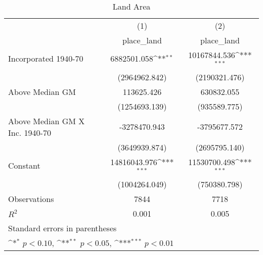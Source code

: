 \begin{table}[htbp]\centering
\def\sym#1{\ifmmode^{#1}\else\(^{#1}\)\fi}
\caption{Land Area}
\begin{tabular}{l*{2}{c}}
\hline\hline
                    &\multicolumn{1}{c}{(1)}&\multicolumn{1}{c}{(2)}\\
                    &\multicolumn{1}{c}{place\_land}&\multicolumn{1}{c}{place\_land}\\
\hline
Incorporated 1940-70& 6882501.058\sym{**} &10167844.536\sym{***}\\
                    &(2964962.842)         &(2190321.476)         \\
[1em]
Above Median GM     &  113625.426         &  630832.055         \\
                    &(1254693.139)         &(935589.775)         \\
[1em]
Above Median GM X Inc. 1940-70&-3278470.943         &-3795677.572         \\
                    &(3649939.874)         &(2695795.140)         \\
[1em]
Constant            &14816043.976\sym{***}&11530700.498\sym{***}\\
                    &(1004264.049)         &(750380.798)         \\
\hline
Observations        &        7844         &        7718         \\
\(R^{2}\)           &       0.001         &       0.005         \\
\hline\hline
\multicolumn{3}{l}{\footnotesize Standard errors in parentheses}\\
\multicolumn{3}{l}{\footnotesize \sym{*} \(p<0.10\), \sym{**} \(p<0.05\), \sym{***} \(p<0.01\)}\\
\end{tabular}
\end{table}
